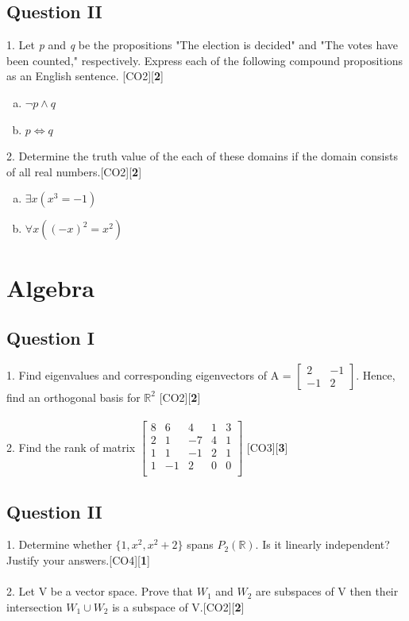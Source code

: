 \documentclass[a4paper]{article}
\begin{document}
\subsection*{Question II}
1. Let \textit{p} and \textit{q} be the propositions "The election is decided" and "The votes have been counted," respectively. Express each of the following compound propositions as an English sentence. \hfill [CO2][{\bf 2}]
\begin{enumerate}[a)]
\item $\neg p \land q$
\item $ p \iff q $
\end{enumerate} 
2. Determine the truth value of the each of these domains if the domain consists of all real numbers.\hfill [CO2][{\bf 2}]
\begin{enumerate}[a)]
\item $\exists x (x^3 = -1) $
\item $\forall x((-x)^2 = x^2)$
\end{enumerate} 


\newpage
\section{Algebra}
\subsection*{Question I}
1. Find eigenvalues and corresponding eigenvectors of A = 
	$\begin{bmatrix}
	2 & -1 \\ -1 & 2
	\end{bmatrix}$. Hence, find an orthogonal basis for $ \mathbb{R} ^2$
	\hfill [CO2][{\bf 2}]\\ \\
2. Find the rank of matrix $
	\begin{bmatrix}
	8 & 6 & 4 & 1 & 3\\
	2 & 1 & -7 & 4 & 1\\	
	1 & 1 & -1 & 2 & 1\\
	1 & -1 & 2 & 0 & 0\\
	\end{bmatrix}$ 
	\hfill [CO3][{\bf 3}]
\subsection*{Question II}
1. Determine whether $\lbrace 1, x^2, x^2 + 2 \rbrace$ spans $P_2(\mathbb{R})$. Is it linearly independent? Justify your answers.\hfill [CO4][{\bf 1}]\\ \\
2. Let V be a vector space. Prove that $W_1$ and $W_2$  are subspaces of V then their intersection $W_1 \cup W_2$ is a subspace of V.\hfill [CO2][{\bf 2}]
\newpage
\end{document}
